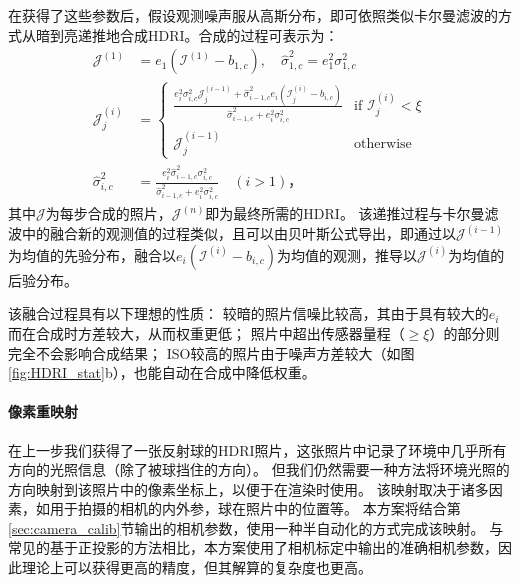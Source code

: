 在获得了这些参数后，假设观测噪声服从高斯分布，即可依照类似卡尔曼滤波的方式从暗到亮递推地合成HDRI。合成的过程可表示为：
\begin{equation}
\begin{aligned}
    \mathcal{J}^{(1)} &= e_1 \left(\mathcal{I}^{(1)} - b_{1,c}\right),\quad
    \hat{\sigma}_{1,c}^2 = e_1^2 \sigma_{1,c}^2 \\
    \mathcal{J}^{(i)}_j &= \begin{cases}
    \frac{e_i^2 \sigma_{i,c}^2 \mathcal{J}^{(i-1)}_j + \hat{\sigma}_{i-1,c}^2 e_i \left(\mathcal{I}^{(i)}_j - b_{i,c}\right)}{\hat{\sigma}_{i-1,c}^2 + e_i^2 \sigma_{i,c}^2} & \text{if } \mathcal{I}^{(i)}_j < \xi \\
    \mathcal{J}^{(i-1)}_j & \text{otherwise}
    \end{cases}\\
    \hat{\sigma}_{i,c}^2 &= \frac{e_i^2 \hat{\sigma}_{i-1,c}^2 \sigma_{i,c}^2}{\hat{\sigma}_{i-1,c}^2 + e_i^2 \sigma_{i,c}^2}
    \quad (i > 1)\text{，}
\end{aligned}
\end{equation}
其中$\mathcal{J}$为每步合成的照片，$\mathcal{J}^{(n)}$即为最终所需的HDRI。
该递推过程与卡尔曼滤波中的融合新的观测值的过程类似，且可以由贝叶斯公式导出，即通过以$\mathcal{J}^{(i-1)}$为均值的先验分布，融合以$e_i\left(\mathcal{I}^{(i)} - b_{i,c}\right)$为均值的观测，推导以$\mathcal{J}^{(i)}$为均值的后验分布。

该融合过程具有以下理想的性质：
较暗的照片信噪比较高，其由于具有较大的$e_i$而在合成时方差较大，从而权重更低；
照片中超出传感器量程（$\geq\xi$）的部分则完全不会影响合成结果；
ISO较高的照片由于噪声方差较大（如图\ref{fig:HDRI_stat}b），也能自动在合成中降低权重。

\paragraph{像素重映射}
在上一步我们获得了一张反射球的HDRI照片，这张照片中记录了环境中几乎所有方向的光照信息（除了被球挡住的方向）。
但我们仍然需要一种方法将环境光照的方向映射到该照片中的像素坐标上，以便于在渲染时使用。
该映射取决于诸多因素，如用于拍摄的相机的内外参，球在照片中的位置等。
本方案将结合第\ref{sec:camera_calib}节输出的相机参数，使用一种半自动化的方式完成该映射。
与常见的基于正投影的方法相比，本方案使用了相机标定中输出的准确相机参数，因此理论上可以获得更高的精度，但其解算的复杂度也更高。

